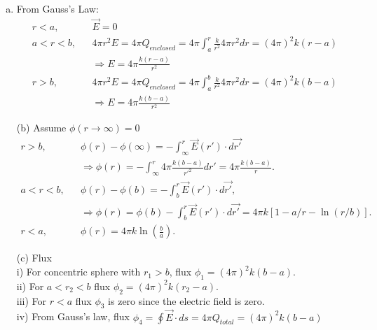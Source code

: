 \documentclass{esg8022pset}
\begin{document}
\begin{solution}
  \begin{enumerate}[(a)]
    \item From Gauss's Law: 
\begin{eqnarray}
r<a,   && \vec{E}=0\\
a<r<b, && 4\pi r^2 E = 4\pi Q_{enclosed} = 4\pi\int_a^r \frac{k}{r^2}4\pi r^2dr=(4\pi)^2k(r-a)\\
       && \Rightarrow E = 4\pi \frac{k(r-a)}{r^2}\\
r>b,   && 4\pi r^2 E = 4\pi Q_{enclosed} = 4\pi\int_a^b \frac{k}{r^2}4\pi r^2dr=(4\pi)^2k(b-a)\\
       && \Rightarrow E= 4\pi \frac{k(b-a)}{r^2}
\end{eqnarray}

(b) Assume $\phi(r\rightarrow\infty)=0$\\
\begin{eqnarray}
r>b,  & &  \phi(r)-\phi(\infty)=-\int_\infty^r \vec{E}(r') \cdot d\vec{r'} \\
      & &\Rightarrow \phi(r)=-\int_\infty^r 4\pi \frac{k(b-a)}{r'^2}dr'=4\pi \frac{k(b-a)}{r}.\\
a<r<b,& &\phi(r)-\phi(b)=-\int_b^r\vec{E}(r') \cdot d\vec{r'},\\
      & &\Rightarrow \phi(r)= \phi(b)-\int_b^r\vec{E}(r') \cdot d\vec{r'}=4\pi k [1-a/r-\ln (r/b)].\\
r<a, & & \phi(r)= 4\pi k\ln (\frac{b}{a}).
\end{eqnarray}

(c) Flux \\
i) For concentric sphere with $r_1>b$, flux $\phi_1=(4\pi)^2k(b-a)$.\\
ii) For $a<r_2<b$ flux $\phi_2=(4\pi)^2k(r_2-a)$.\\
iii) For $r<a$ flux $\phi_3$ is zero since the electric field is zero.\\
iv) From Gauss's law, flux $\phi_4=\oint\vec{E} \cdot ds = 4\pi
Q_{total} = (4\pi)^2 k(b-a)$
  \end{enumerate}
\end{solution}
\end{document}

